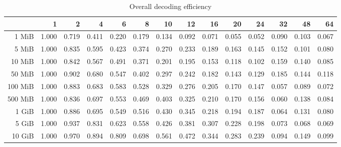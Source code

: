 \begin{centering}
\begin{table}[!h]
	\caption{Overall decoding efficiency}
	\begin{tabular}{rrrrrrrrrrrrrr}
		\toprule
		\diagbox[width=7em]{Size}{Threads}  &    1  &    2  &    4  &    6  &    8  &    10 &    12 &    16 &    20 &    24 &    32 &    48 &    64 \\
		\midrule
		1 MiB   & 1.000 & 0.719 & 0.411 & 0.220 & 0.179 & 0.134 & 0.092 & 0.071 & 0.055 & 0.052 & 0.090 & 0.103 & 0.067 \\
		5 MiB   & 1.000 & 0.835 & 0.595 & 0.423 & 0.374 & 0.270 & 0.233 & 0.189 & 0.163 & 0.145 & 0.152 & 0.101 & 0.080 \\
		10 MiB  & 1.000 & 0.842 & 0.567 & 0.491 & 0.371 & 0.201 & 0.195 & 0.153 & 0.118 & 0.102 & 0.159 & 0.140 & 0.085 \\
		50 MiB  & 1.000 & 0.902 & 0.680 & 0.547 & 0.402 & 0.297 & 0.242 & 0.182 & 0.143 & 0.129 & 0.185 & 0.144 & 0.118 \\
		100 MiB & 1.000 & 0.883 & 0.683 & 0.583 & 0.528 & 0.329 & 0.276 & 0.205 & 0.170 & 0.147 & 0.057 & 0.089 & 0.072 \\
		500 MiB & 1.000 & 0.836 & 0.697 & 0.553 & 0.469 & 0.403 & 0.325 & 0.210 & 0.170 & 0.156 & 0.060 & 0.138 & 0.084 \\
		1 GiB   & 1.000 & 0.886 & 0.695 & 0.549 & 0.516 & 0.430 & 0.345 & 0.218 & 0.194 & 0.187 & 0.064 & 0.131 & 0.080 \\
		5 GiB   & 1.000 & 0.937 & 0.831 & 0.623 & 0.558 & 0.426 & 0.381 & 0.307 & 0.228 & 0.198 & 0.073 & 0.068 & 0.069 \\
		10 GiB  & 1.000 & 0.970 & 0.894 & 0.809 & 0.698 & 0.561 & 0.472 & 0.344 & 0.283 & 0.239 & 0.094 & 0.149 & 0.099 \\
		\bottomrule
	\end{tabular}
\end{table}


\end{centering}

